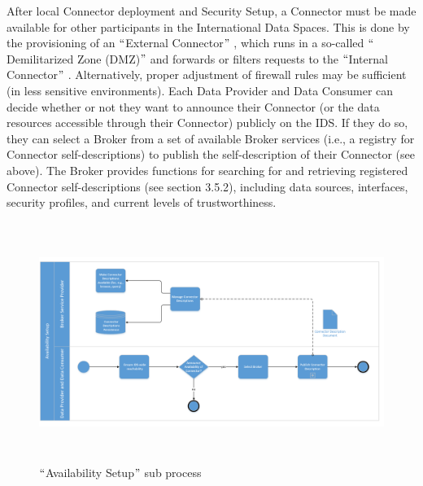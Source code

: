 After local Connector deployment and Security Setup, a Connector must be made available for other participants in the International Data Spaces. This is done by the provisioning of an $``$External Connector$"$ , which runs in a so-called $``$Demilitarized Zone (DMZ)$"$  and forwards or filters requests to the $``$Internal Connector$"$ . Alternatively, proper adjustment of firewall rules may be sufficient (in less sensitive environments). Each Data Provider and Data Consumer can decide whether or not they want to announce their Connector (or the data resources accessible through their Connector) publicly on the IDS. If they do so, they can select a Broker from a set of available Broker services (i.e., a registry for Connector self-descriptions) to publish the self-description of their Connector (see above). The Broker provides functions for searching for and retrieving registered Connector self-descriptions (see section 3.5.2), including data sources, interfaces, security profiles, and current levels of trustworthiness.




\begin{figure}[H]
	\begin{Center}
		\includegraphics[width=6.25in,height=3.06in]{./media/image25.png}
		\caption{$``$Availability Setup$"$  sub process}
		\label{fig:Availability_Setup_sub_process}
	\end{Center}
\end{figure}





